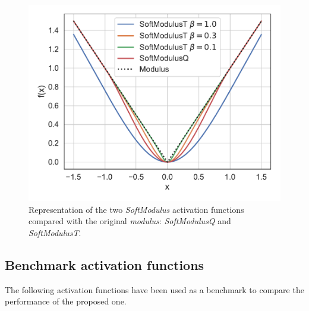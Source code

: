 \documentclass[authoryear]{elsarticle}
\begin{document}
\begin{figure}[h!]
	\centering
	\includegraphics[width=0.5\linewidth]{figs/activations_smooth}
	\caption{Representation of the two \textit{SoftModulus} activation functions compared with the original \textit{modulus}: \textit{SoftModulusQ} and \textit{SoftModulusT}.}
	\label{fig:activationssmooth}
\end{figure}

\subsection{Benchmark activation functions}
The following activation functions have been used as a benchmark to compare the performance of the proposed one.
\end{document}
